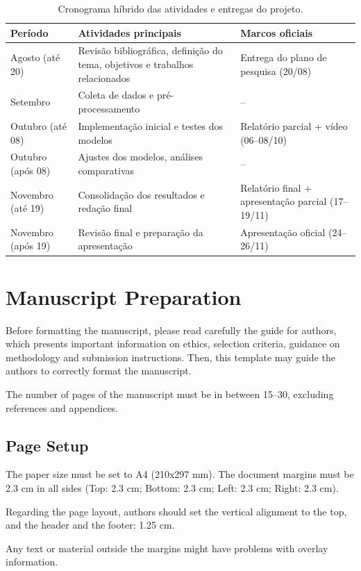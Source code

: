 \documentclass[english, spanish, brazilian]{RBIEarticle} %
\begin{document}
\begin{table}[h]
\centering
\begin{tabular}{p{3cm} p{7cm} p{5cm}}
\hline
\textbf{Período} & \textbf{Atividades principais} & \textbf{Marcos oficiais} \\
\hline
Agosto (até 20) & Revisão bibliográfica, definição do tema, objetivos e trabalhos relacionados & Entrega do plano de pesquisa (20/08) \\
Setembro        & Coleta de dados e pré-processamento & -- \\
Outubro (até 08) & Implementação inicial e testes dos modelos & Relatório parcial + vídeo (06--08/10) \\
Outubro (após 08) & Ajustes dos modelos, análises comparativas & -- \\
Novembro (até 19) & Consolidação dos resultados e redação final & Relatório final + apresentação parcial (17--19/11) \\
Novembro (após 19) & Revisão final e preparação da apresentação & Apresentação oficial (24--26/11) \\
\hline
\end{tabular}
\caption{Cronograma híbrido das atividades e entregas do projeto.}
\label{tab:cronograma}
\end{table}

\section{Manuscript Preparation}
Before formatting the manuscript, please read carefully the guide for authors, which presents important information on ethics, selection criteria, guidance on methodology and submission instructions. Then, this template may guide the authors to correctly format the manuscript.

The number of pages of the manuscript must be in between 15--30, excluding references and appendices.


\subsection{Page Setup}
The paper size must be set to A4 (210x297 mm). The document margins must be 2.3 cm in all sides (Top: 2.3 cm; Bottom: 2.3 cm; Left: 2.3 cm; Right: 2.3 cm).

Regarding the page layout, authors should set the vertical alignment to the top, and the header and the footer: 1.25 cm.

Any text or material outside the margins might have problems with overlay information.
\end{document}
